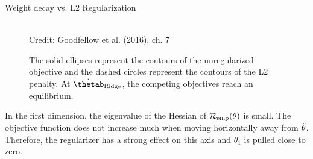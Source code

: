 \begin{vbframe}{Weight decay vs. L2 Regularization}
  \begin{figure}
    \centering
      \tiny{\\ Credit: Goodfellow et al. (2016), ch. 7}
      \caption{\footnotesize The solid ellipses represent the contours of the unregularized objective and the dashed circles represent the contours of the L2 penalty. At $\hat{\thetab}_{\text{Ridge}}$, the competing objectives reach an equilibrium.}
  \end{figure}
  \small
  
   In the first dimension, the eigenvalue of the Hessian of $\mathcal{R}_{\text{emp}}(\theta)$ is small. The objective function does not increase much when moving horizontally away from $\hat{\theta}$. Therefore, the regularizer has a strong effect on this axis and $\theta_1$ is pulled close to zero.
    
\framebreak
    

\end{vbframe}
